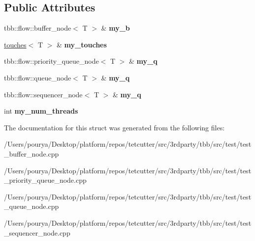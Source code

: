 \subsection*{Public Attributes}
\begin{DoxyCompactItemize}
\item 
\hypertarget{structparallel__gets_a9cf03f1acdcc09db4ab87a184d047364}{}tbb\+::flow\+::buffer\+\_\+node$<$ T $>$ \& {\bfseries my\+\_\+b}\label{structparallel__gets_a9cf03f1acdcc09db4ab87a184d047364}

\item 
\hypertarget{structparallel__gets_af314dd6ba980f2370db806d577bb904b}{}\hyperlink{structtouches}{touches}$<$ T $>$ \& {\bfseries my\+\_\+touches}\label{structparallel__gets_af314dd6ba980f2370db806d577bb904b}

\item 
\hypertarget{structparallel__gets_aba1fd88036c6c499462148d7a3e1f990}{}tbb\+::flow\+::priority\+\_\+queue\+\_\+node$<$ T $>$ \& {\bfseries my\+\_\+q}\label{structparallel__gets_aba1fd88036c6c499462148d7a3e1f990}

\item 
\hypertarget{structparallel__gets_a61295d6a070ba79c739492cdc0252540}{}tbb\+::flow\+::queue\+\_\+node$<$ T $>$ \& {\bfseries my\+\_\+q}\label{structparallel__gets_a61295d6a070ba79c739492cdc0252540}

\item 
\hypertarget{structparallel__gets_a8959523a323a8b966571bedc7b67e9f9}{}tbb\+::flow\+::sequencer\+\_\+node$<$ T $>$ \& {\bfseries my\+\_\+q}\label{structparallel__gets_a8959523a323a8b966571bedc7b67e9f9}

\item 
\hypertarget{structparallel__gets_a36434fcc25d542daa53c8db5378b1b61}{}int {\bfseries my\+\_\+num\+\_\+threads}\label{structparallel__gets_a36434fcc25d542daa53c8db5378b1b61}

\end{DoxyCompactItemize}


The documentation for this struct was generated from the following files\+:\begin{DoxyCompactItemize}
\item 
/\+Users/pourya/\+Desktop/platform/repos/tetcutter/src/3rdparty/tbb/src/test/test\+\_\+buffer\+\_\+node.\+cpp\item 
/\+Users/pourya/\+Desktop/platform/repos/tetcutter/src/3rdparty/tbb/src/test/test\+\_\+priority\+\_\+queue\+\_\+node.\+cpp\item 
/\+Users/pourya/\+Desktop/platform/repos/tetcutter/src/3rdparty/tbb/src/test/test\+\_\+queue\+\_\+node.\+cpp\item 
/\+Users/pourya/\+Desktop/platform/repos/tetcutter/src/3rdparty/tbb/src/test/test\+\_\+sequencer\+\_\+node.\+cpp\end{DoxyCompactItemize}
